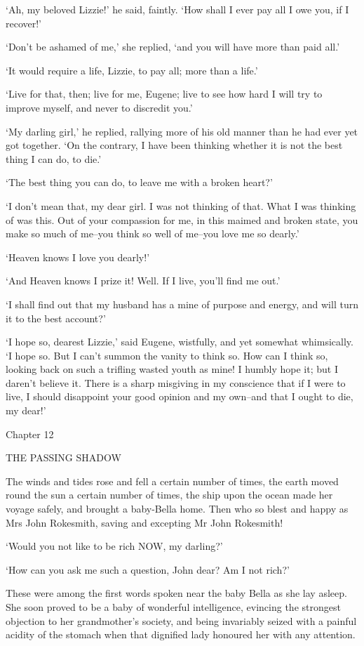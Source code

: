 ‘Ah, my beloved Lizzie!’ he said, faintly. ‘How shall I ever pay all I
owe you, if I recover!’

‘Don’t be ashamed of me,’ she replied, ‘and you will have more than paid
all.’

‘It would require a life, Lizzie, to pay all; more than a life.’

‘Live for that, then; live for me, Eugene; live to see how hard I will
try to improve myself, and never to discredit you.’

‘My darling girl,’ he replied, rallying more of his old manner than
he had ever yet got together. ‘On the contrary, I have been thinking
whether it is not the best thing I can do, to die.’

‘The best thing you can do, to leave me with a broken heart?’

‘I don’t mean that, my dear girl. I was not thinking of that. What I was
thinking of was this. Out of your compassion for me, in this maimed and
broken state, you make so much of me--you think so well of me--you love
me so dearly.’

‘Heaven knows I love you dearly!’

‘And Heaven knows I prize it! Well. If I live, you’ll find me out.’

‘I shall find out that my husband has a mine of purpose and energy, and
will turn it to the best account?’

‘I hope so, dearest Lizzie,’ said Eugene, wistfully, and yet somewhat
whimsically. ‘I hope so. But I can’t summon the vanity to think so. How
can I think so, looking back on such a trifling wasted youth as mine! I
humbly hope it; but I daren’t believe it. There is a sharp misgiving
in my conscience that if I were to live, I should disappoint your good
opinion and my own--and that I ought to die, my dear!’



Chapter 12

THE PASSING SHADOW


The winds and tides rose and fell a certain number of times, the earth
moved round the sun a certain number of times, the ship upon the ocean
made her voyage safely, and brought a baby-Bella home. Then who so blest
and happy as Mrs John Rokesmith, saving and excepting Mr John Rokesmith!

‘Would you not like to be rich NOW, my darling?’

‘How can you ask me such a question, John dear? Am I not rich?’

These were among the first words spoken near the baby Bella as she lay
asleep. She soon proved to be a baby of wonderful intelligence,
evincing the strongest objection to her grandmother’s society, and
being invariably seized with a painful acidity of the stomach when that
dignified lady honoured her with any attention.

